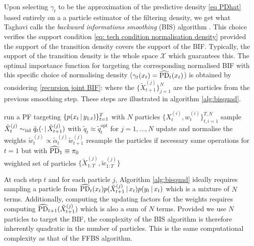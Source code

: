 Upon selecting $\gamma_{t}$ to be the approximation of the predictive density \eqref{eq PDhat} based entirely on a a particle estimator of the filtering density, we get what Taghavi calls the \emph{backward informations smoothing} (BIS) algorithm \citet{taghavi12}. This choice verifies the support condition \eqref{eq: tech condition normalisation density} provided the support  of the transition density covers the support of the BIF. Typically, the support of the transition density is the whole space $\mathcal X$ which guarantees this. The optimal importance function for targeting the corresponding normalised BIF with this specific choice of normalising density ($\gamma_{t}(x_{t})=\widehat{\text{PD}}_{t}(x_{t})$) is obtained by considering \eqref{recursion joint BIF}:
where the $\{\tilde X_{t+1}^{(j)}\}_{j=1}^{N}$ are the particles from the previous smoothing step. These steps are illustrated in algorithm \ref{alg:bisquad}.

%
\begin{algorithm}[!h]\small
	\caption{\label{alg:bisquad}}
	\begin{algorithmic}[1]
		\State run a PF targeting $\{p(x_{t}\,|\, y_{1:t})\}_{t=1}^{T}$ with $N$ particles $\{X^{(i)}_{t}, w^{(i)}_{t}\}_{t,i=1}^{T,N}$
			\State sample $\tilde X^{(j)}_{t}\sim_{\mathrm{iid}} \tilde q_{t}(\cdot\,|\, \tilde X^{(j)}_{t+1})$ with $\tilde q_{t}\approx \tilde q_{t}^{\text{opt}}$ for $j=1,\dots,N$
			\State update and normalise the weights $\tilde w^{(j)}_{t}\propto \tilde\alpha^{(j)}_{t}\tilde w^{(j)}_{t+1}$
			\State resample the particles if necessary
		\EndFor
		\State same operations for $t=1$ but with 
			$\widehat{\text{PD}}_{1} \equiv \pi_{0}$\\

		\Return weighted set of particles $\{\tilde X^{(j)}_{1:T}, \tilde w^{(j)}_{1:T}\}$
	\end{algorithmic}
\end{algorithm}
%

At each step $t$ and for each particle $j$, Algorithm \ref{alg:bisquad} ideally requires sampling a particle from $\widehat{\text{PD}}_{t}(x_{t})p(\tilde X^{(j)}_{t+1}\,|\, x_{t})p(y_{t}\,|\, x_{t})$ which is a mixture of $N$ terms. Additionally, computing the updating factors for the weights requires computing $\widehat{\text{PD}}_{t+1}(\tilde X_{t+1}^{(j)})$ which is also a sum of $N$ terms. Provided we use $N$ particles to target the BIF, the complexity of the BIS algorithm is therefore inherently quadratic in the number of particles. This is the same computational complexity as that of the FFBS algorithm.

